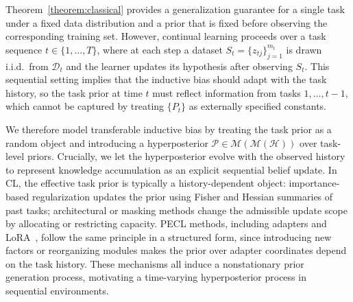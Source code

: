 \documentclass{article}
\theoremstyle{plain}
\theoremstyle{definition}
\theoremstyle{remark}
\begin{document}


Theorem~\ref{theorem:classical} provides a generalization guarantee for a single task under a fixed data distribution and a prior that is fixed before observing the corresponding training set.
However, continual learning proceeds over a task sequence $t\in\{1,\dots,T\}$, where at each step a dataset $S_t=\{z_{tj}\}_{j=1}^{m_t}$ is drawn i.i.d.\ from $\mathcal D_t$ and the learner updates its hypothesis after observing $S_t$.
This sequential setting implies that the inductive bias should adapt with the task history, so the task prior at time $t$ must reflect information from tasks $1,\dots,t-1$, which cannot be captured by treating $\{P_t\}$ as externally specified constants.

We therefore model transferable inductive bias by treating the task prior as a random object and introducing a hyperposterior $\mathcal P\in\mathcal M(\mathcal M(\mathcal H))$ over task-level priors.
Crucially, we let the hyperposterior evolve with the observed history to represent knowledge accumulation as an explicit sequential belief update. In CL, the effective task prior is typically a history-dependent object: importance-based regularization \cite{EWC2017,SI2017} updates the prior using Fisher and Hessian summaries of past tasks; architectural or masking methods \cite{progressive2016,HAT2018,Piggyback2018,Supermasks2020} change the admissible update scope by allocating or restricting capacity. PECL methods, including adapters\cite{adapter2019} and LoRA~\cite{hu2022lora}, follow the same principle in a structured form, since introducing new factors or reorganizing modules makes the prior over adapter coordinates depend on the task history. These mechanisms all induce a nonstationary prior generation process, motivating a time-varying hyperposterior process in sequential environments.
\end{document}
